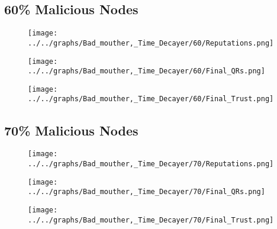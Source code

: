 \begin{minipage}[t]{0.49\columnwidth}
\subsection*{60\% Malicious Nodes}
    \begin{figure}[H]
        \centering
        \texttt{[image: ../../graphs/Bad\_mouther,\_Time\_Decayer/60/Reputations.png]}
    \end{figure}
    \begin{figure}[H]
        \centering
        \texttt{[image: ../../graphs/Bad\_mouther,\_Time\_Decayer/60/Final\_QRs.png]}
    \end{figure}
\end{minipage}
\begin{minipage}[t]{0.49\columnwidth}
    \begin{figure}[H]
        \centering
        \texttt{[image: ../../graphs/Bad\_mouther,\_Time\_Decayer/60/Final\_Trust.png]}
    \end{figure}
\end{minipage}

\begin{minipage}[t]{0.49\columnwidth}
\subsection*{70\% Malicious Nodes}
    \begin{figure}[H]
        \centering
        \texttt{[image: ../../graphs/Bad\_mouther,\_Time\_Decayer/70/Reputations.png]}
    \end{figure}
    \begin{figure}[H]
        \centering
        \texttt{[image: ../../graphs/Bad\_mouther,\_Time\_Decayer/70/Final\_QRs.png]}
    \end{figure}
\end{minipage}
\begin{minipage}[t]{0.49\columnwidth}
    \begin{figure}[H]
        \centering
        \texttt{[image: ../../graphs/Bad\_mouther,\_Time\_Decayer/70/Final\_Trust.png]}
    \end{figure}
\end{minipage}

